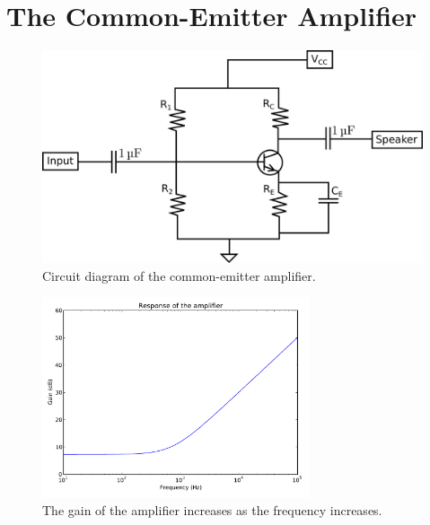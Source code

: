 \documentclass[11pt,letterpaper]{article}
\begin{document}
% 
% 
% 

\section{The Common-Emitter Amplifier}

\begin{figure}
    \centering
    \includegraphics[width=\textwidth]{figures/amplifier.png}
    \caption{Circuit diagram of the common-emitter amplifier.}
    \label{amplifier}
\end{figure}

\begin{figure}
    \centering
    \includegraphics[width=0.7\textwidth]{figures/ampgain.pdf}
    \caption{The gain of the amplifier increases as the frequency increases.}
    \label{ampgainplot}
\end{figure}
\end{document}
